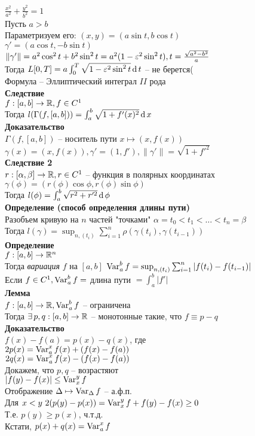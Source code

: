 \documentclass[12pt]{article}
\begin{document}
$\frac{x^2}{a^2} + \frac{y^2}{b^2}=1$\\
Пусть $a > b$\\
Параметризуем его: $(x, y) = (a\sin t, b\cos t)$\\
$\gamma' = (a\cos t, -b\sin t)$\\
$\|\gamma'\| = a^2\cos^2 t + b^2 \sin^2 t = a^2(1 -\varepsilon^2 \sin^2 t), t = \frac{\sqrt{a^2 - b^2}}{a}$\\
Тогда $L[0,T] = a\int_0^T\sqrt{1-\varepsilon^2 \sin^2 t}\operatorname{d} t$ -- не берется(\\
Формула -- Эллиптический интеграл $II$ рода\\
\textbf{Следствие}\\
$f:[a,b] \rightarrow \mathbb{R}, f\in C^1$\\
Тогда $l(\Gamma(f, [a,b])) = \int_a^b \sqrt{1 + f'(x)^2}\operatorname{d} x$\\
\textbf{Доказательство}\\
$\Gamma(f, [a,b])$ -- носитель пути $x \mapsto (x, f(x))$\\
$\gamma(x) = (x, f(x)), \gamma'=(1,f'), \|\gamma'\| = \sqrt{1 + f'^2}$\\
\textbf{Следствие 2}\\
$r: [\alpha, \beta] \rightarrow \mathbb{R}, r \in C^1$ -- функция в полярных координатах\\
$\gamma(\phi) = (r(\phi)\cos \phi, r(\phi)\sin\phi)$\\
Тогда $l(\phi) = \int_a^b \sqrt{r^2 + r'^2}\operatorname{d} \phi$\\
\textbf{Определение (способ определения длины пути)}\\
Разобъем кривую на $n$ частей "точками" $\alpha = t_0 < t_1 < \ldots < t_n = \beta$\\
Тогда $l(\gamma) = \sup_{n, (t_i)} \sum_{i=1}^n \rho(\gamma(t_i), \gamma(t_{i-1}))$\\
\textbf{Определение}\\
$f:[a, b] \rightarrow \mathbb{R}^n$\\
Тогда \textit{вариация} $f$ на $[a,b]$ $\operatorname{Var}_a^b f = \sup_{n, (t_i)} \sum_{i=1}^n |f(t_i)-f(t_{i-1})|$\\
Если $f \in C^1, \operatorname{Var}_a^b f = $ длина пути $ = \int_a^b |f'|$\\
\textbf{Лемма}\\
$f:[a,b] \rightarrow \mathbb{R}, \operatorname{Var}_a^b f$ -- ограничена\\
Тогда $\exists\, p,q: [a,b]\rightarrow \mathbb{R}$ -- монотонные такие, что $f\equiv p-q$\\
\textbf{Доказательство}\\
$f(x)-f(a)=p(x)-q(x)$, где\\
$2p(x) = \operatorname{Var}_a^x f(x)+(f(x)-f(a))$\\
$2q(x) = \operatorname{Var}_a^x f(x) - (f(x) - f(a))$\\
Докажем, что $p,q$ -- возрастяют\\
$|f(y)-f(x)| \leq \operatorname{Var}_x^y f$\\
Отображение $\Delta \mapsto \operatorname{Var}_\Delta f$ -- а.ф.п.\\
Для $x < y\ 2(p(y)-p(x))=\operatorname{Var}_x^y f + f(y)-f(x) \geq 0$\\
Т.е. $p(y) \geq p(x)$, ч.т.д.\\
Кстати, $p(x) + q(x) = \operatorname{Var}_a^x f$\\
\end{document}
